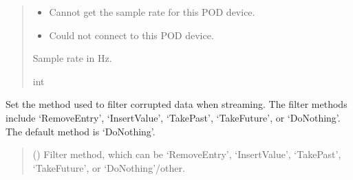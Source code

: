 \documentclass[letterpaper,10pt,english]{sphinxmanual}
\begin{document}
\begin{fulllineitems}
\begin{fulllineitems}
\begin{quote}
\begin{description}
\begin{itemize}
\item {} 
\sphinxAtStartPar
{} \textendash{} Cannot get the sample rate for this POD device.

\item {} 
\sphinxAtStartPar
{} \textendash{} Could not connect to this POD device.

\end{itemize}

\sphinxAtStartPar
Sample rate in Hz.

\sphinxAtStartPar
int

\end{description}\end{quote}

\end{fulllineitems}


\begin{fulllineitems}
\label{\detokenize{Morelia.Stream.Collect:Morelia.Stream.Collect.DataHose.Hose.PickFilterMethod}}
\pysigstartsignatures
{}
\pysigstopsignatures
\sphinxAtStartPar
Set the method used to filter corrupted data when streaming. The filter methods         include ‘RemoveEntry’, ‘InsertValue’, ‘TakePast’, ‘TakeFuture’, or ‘DoNothing’.          The default method is ‘DoNothing’.
\begin{quote}\begin{description}
\sphinxAtStartPar
{} () \textendash{} Filter method, which can be ‘RemoveEntry’,
‘InsertValue’, ‘TakePast’, ‘TakeFuture’, or ‘DoNothing’/other.

\end{description}\end{quote}

\end{fulllineitems}



\end{fulllineitems}
\end{document}
